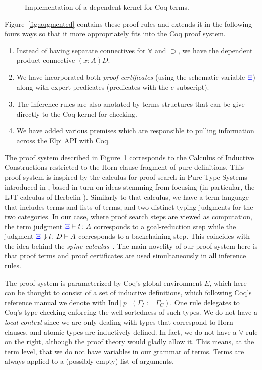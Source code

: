 \begin{figure}


\caption{Implementation of a  dependent kernel for Coq terms.}
\label{fig:kernel}
\end{figure}

Figure~\ref{fig:augmented} contains these proof rules and extends it
in the following fours ways so that it more appropriately fits into
the Coq proof system.
\begin{enumerate}
  \item Instead of having separate connectives for $\forall$ and
    $\supset$, we have the dependent product connective $(x:A)D$. 
  \item We have incorporated both \emph{proof certificates} (using the
    schematic variable ${\color{blue}{\Xi}}$) along with expert predicates
    (predicates with the $e$ subscript).
  \item The inference rules are also anotated by terms structures that
    can be give directly to the Coq kernel for checking.
  \item We have added various premises which are responsible to
    pulling information across the Elpi API with Coq.
\end{enumerate}
The proof system described in Figure~\ref{fig:kernel} corresponds to
the Calculus of Inductive Constructions restricted to the Horn clause
fragment of pure  definitions.
This proof system is inspired by the calculus for proof search in
Pure Type Systems introduced in \cite{LengrandDM06}, based in turn on
ideas stemming from focusing (in particular, the LJT calculus of
Herbelin \cite{Herbelin94}). Similarly to that calculus, we have a
term language that includes terms and lists of terms, and two distinct
typing judgments for the two categories. In our case, where proof
search steps are viewed as computation, the term judgment ${\color{blue}{\Xi}}\vdash
t \colon A$ corresponds to a goal-reduction step while the judgment
${\color{blue}{\Xi}} \Downarrow l \colon D\vdash A$ corresponds to a backchaining
step. This coincides with the idea behind the \emph{spine
  calculus}~\cite{Cervesato97tr}.  The main novelity of our proof
system here is that proof terms and proof certificates are used
simultaneously in all inference rules.

The proof system is parameterized by Coq's global environment $E$, which
here can be thought to consist of a set of inductive definitions,
which following Coq's reference manual we denote with
$\mathrm{Ind}[p]  (\Gamma_I := \Gamma_C)$.  One  rule delegates
to Coq's type checking enforcing the well-sortedness of such types. We
do not have a \emph{local context} since we are only dealing with types
that correspond to Horn clauses, and atomic types are inductively
defined. In fact, we do not have a $\forall$ rule on the right,
although the proof theory would gladly allow it. This means, at the
term level, that we do not have variables in our grammar of
terms. Terms are always applied to a (possibly empty) list of
arguments.

